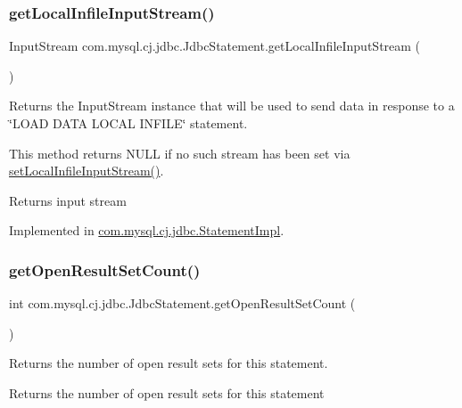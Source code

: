 \subsubsection{\texorpdfstring{get\+Local\+Infile\+Input\+Stream()}{getLocalInfileInputStream()}}
{\footnotesize\ttfamily Input\+Stream com.\+mysql.\+cj.\+jdbc.\+Jdbc\+Statement.\+get\+Local\+Infile\+Input\+Stream (\begin{DoxyParamCaption}{ }\end{DoxyParamCaption})}

Returns the Input\+Stream instance that will be used to send data in response to a \char`\"{}\+L\+O\+A\+D D\+A\+T\+A L\+O\+C\+A\+L I\+N\+F\+I\+L\+E\char`\"{} statement.

This method returns N\+U\+LL if no such stream has been set via \mbox{\hyperlink{interfacecom_1_1mysql_1_1cj_1_1jdbc_1_1_jdbc_statement_a89093285d02aa790bb07c7afab7c4140}{set\+Local\+Infile\+Input\+Stream()}}.

\begin{DoxyReturn}{Returns}
input stream 
\end{DoxyReturn}


Implemented in \mbox{\hyperlink{classcom_1_1mysql_1_1cj_1_1jdbc_1_1_statement_impl_a52f35ba4029870388a69d493851e726a}{com.\+mysql.\+cj.\+jdbc.\+Statement\+Impl}}.

\mbox{\label{interfacecom_1_1mysql_1_1cj_1_1jdbc_1_1_jdbc_statement_ad7367340b87accdd66c01872ebaddbcd}} 
\subsubsection{\texorpdfstring{get\+Open\+Result\+Set\+Count()}{getOpenResultSetCount()}}
{\footnotesize\ttfamily int com.\+mysql.\+cj.\+jdbc.\+Jdbc\+Statement.\+get\+Open\+Result\+Set\+Count (\begin{DoxyParamCaption}{ }\end{DoxyParamCaption})}

Returns the number of open result sets for this statement.

\begin{DoxyReturn}{Returns}
the number of open result sets for this statement 
\end{DoxyReturn}


